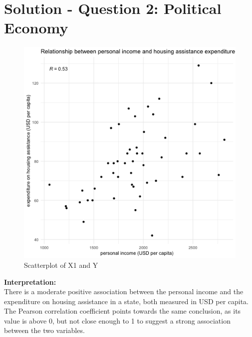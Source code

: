 \documentclass[12pt,letterpaper]{article}
\begin{document}
	\section*{Solution - Question 2: Political Economy}
\begin{figure}[h!]\centering
	\caption{\footnotesize Scatterplot of X1 and Y}
	\label{fig:plot_1}
	\includegraphics[width=.95\textwidth]{scatter_x1_y.png}
\end{figure} 
\textbf{Interpretation:} \\ There is a moderate positive association between the personal income and the expenditure on housing assistance in a state, both measured in USD per capita. The Pearson correlation coefficient points towards the same conclusion, as its value is above 0, but not close enough to 1 to suggest a strong association between the two variables. 
\newpage
\end{document}
